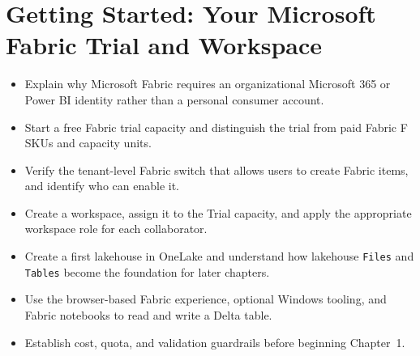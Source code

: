 \chapter{Getting Started: Your Microsoft Fabric Trial and Workspace}
%
%

\begin{objectives}
\begin{itemize}
    \item Explain why Microsoft Fabric requires an organizational Microsoft 365 or Power BI identity rather than a personal consumer account.
    \item Start a free Fabric trial capacity and distinguish the trial from paid Fabric F SKUs and capacity units.
    \item Verify the tenant-level Fabric switch that allows users to create Fabric items, and identify who can enable it.
    \item Create a workspace, assign it to the Trial capacity, and apply the appropriate workspace role for each collaborator.
    \item Create a first lakehouse in OneLake and understand how lakehouse \texttt{Files} and \texttt{Tables} become the foundation for later chapters.
    \item Use the browser-based Fabric experience, optional Windows tooling, and Fabric notebooks to read and write a Delta table.
    \item Establish cost, quota, and validation guardrails before beginning Chapter~1.
\end{itemize}
\end{objectives}

